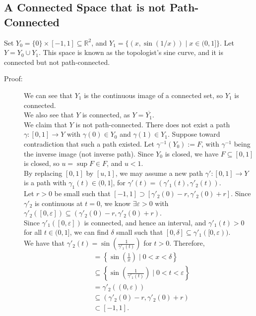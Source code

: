 \documentclass[9pt]{extarticle}
\newcommand{\R}{\mathbb{R}}
\begin{document}
  \subsection{A Connected Space that is not Path-Connected}%
  Set $Y_0 = \{0\}\times [-1,1]\subseteq \R^2$, and $Y_1 = \{(x,\sin(1/x))\mid x\in (0,1]\}$. Let $Y = Y_0 \cup Y_1$. This space is known as the topologist's sine curve, and it is connected but not path-connected.
  \begin{description}
    \item[Proof:] We can see that $Y_1$ is the continuous image of a connected set, so $Y_1$ is connected.\\

      We also see that $Y$ is connected, as $Y = \overline{Y_1}$.\\

      We claim that $Y$ is not path-connected. There does not exist a path $\gamma: [0,1]\rightarrow Y$ with $\gamma(0)\in Y_0$ and $\gamma(1)\in Y_1$. Suppose toward contradiction that such a path existed. Let $\gamma^{-1}(Y_0) := F$, with $\gamma^{-1}$ being the inverse image (not inverse path). Since $Y_0$ is closed, we have $F\subseteq [0,1]$ is closed, so $u = \sup F \in F$, and $u < 1$.\\

      By replacing $[0,1]$ by $[u,1]$, we may assume a new path $\gamma': [0,1]\rightarrow Y$ is a path with $\gamma_1(t) \in (0,1]$, for $\gamma'(t) = (\gamma'_1(t),\gamma'_2(t))$.\\

      Let $r>0$ be small such that $[-1,1] \supset [\gamma'_2(0)-r,\gamma'_2(0)+r]$. Since $\gamma'_2$ is continuous at $t=0$, we know $\exists \varepsilon > 0$ with $\gamma'_2([0,\varepsilon])\subseteq (\gamma'_2(0)-r,\gamma'_2(0) + r)$.\\

      Since $\gamma'_1([0,\varepsilon])$ is connected, and hence an interval, and $\gamma'_1(t) > 0$ for all $t\in (0,1]$, we can find $\delta$ small such that $[0,\delta]\subseteq \gamma'_1([0,\varepsilon))$.\\

      We have that $\gamma'_2(t) = \sin \left(\frac{1}{\gamma'_1(t)}\right)$ for $t > 0$. Therefore,
      \begin{align*}
        [-1,1] &= \left\{\sin\left(\frac{1}{x}\right) \mid 0 < x < \delta\right\}\\
               &\subseteq \left\{\sin \left(\frac{1}{\gamma'_1(t)}\right)\mid 0 < t < \varepsilon\right\}\\
               &= \gamma'_2((0,\varepsilon))\\
               &\subseteq (\gamma'_2(0)-r,\gamma'_2(0)+r)\\
               &\subset [-1,1].
      \end{align*}
  \end{description}
\end{document}
